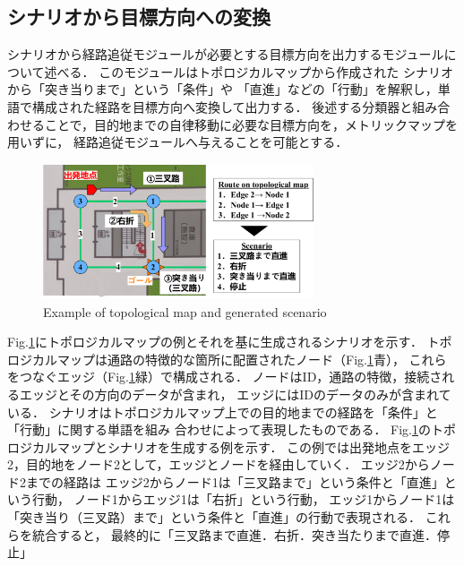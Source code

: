 \documentclass{sice-si}
\begin{document}
\subsection{シナリオから目標方向への変換}
シナリオから経路追従モジュールが必要とする目標方向を出力するモジュールについて述べる．
このモジュールはトポロジカルマップから作成された
シナリオから「突き当りまで」という「条件」や
「直進」などの「行動」を解釈し，単語で構成された経路を目標方向へ変換して出力する．
後述する分類器と組み合わせることで，目的地までの自律移動に必要な目標方向を，メトリックマップを用いずに，
経路追従モジュールへ与えることを可能とする．
\par
\begin{figure}[htbp]
    \centering
     \includegraphics[height=40mm,width=80mm]{./figs/topo2sce.pdf}
     \caption{Example of topological map and generated scenario}\label{fig:topo2sce}
\end{figure}
\par
Fig.\ref{fig:topo2sce}にトポロジカルマップの例とそれを基に生成されるシナリオを示す．
トポロジカルマップは通路の特徴的な箇所に配置されたノード（Fig.\ref{fig:topo2sce}青），
これらをつなぐエッジ（Fig.\ref{fig:topo2sce}緑）で構成される．
ノードはID，通路の特徴，接続されるエッジとその方向のデータが含まれ，
エッジにはIDのデータのみが含まれている．
シナリオはトポロジカルマップ上での目的地までの経路を「条件」と「行動」に関する単語を組み
合わせによって表現したものである．
Fig.\ref{fig:topo2sce}のトポロジカルマップとシナリオを生成する例を示す．
この例では出発地点をエッジ2，目的地をノード2として，エッジとノードを経由していく．
エッジ2からノード2までの経路は
エッジ2からノード1は「三叉路まで」という条件と「直進」という行動，
ノード1からエッジ1は「右折」という行動，
エッジ1からノード1は「突き当り（三叉路）まで」という条件と「直進」の行動で表現される．
これらを統合すると，
最終的に「三叉路まで直進．右折．突き当たりまで直進．停止」
\end{document}
